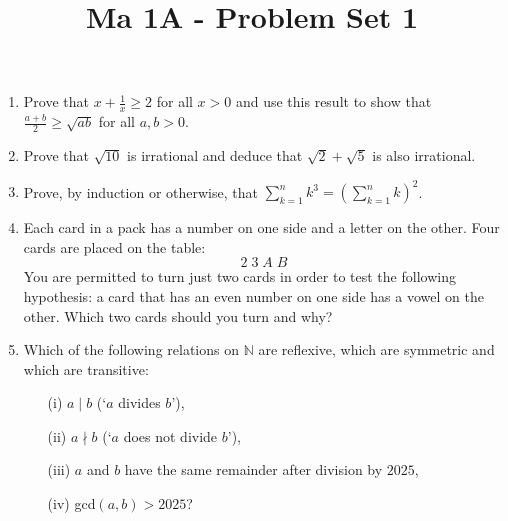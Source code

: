 \documentclass[11pt]{article}
\title{\vspace{-0.7cm}Ma 1A - Problem Set 1}
\date{}
\begin{document}
\maketitle

\begin{enumerate}

\item
Prove that $x + \frac 1x \geq 2$ for all $x > 0$ and use this result to show that $\frac{a+b}{2} \geq \sqrt{ab}$ for all $a, b > 0$.

\item
Prove that $\sqrt{10}$ is irrational and deduce that $\sqrt{2} + \sqrt{5}$ is also irrational.

\item
Prove, by induction or otherwise, that $\sum_{k=1}^n k^3 = \left(\sum_{k=1}^n k\right)^2$.

\item
Each card in a pack has a number on one side and a letter on the other. Four cards are
placed on the table:
\[ \boxed{2} \; \boxed{3} \; \boxed{A} \; \boxed{B}\]
You are permitted to turn just two cards in order to test the following hypothesis: a card that
has an even number on one side has a vowel on the other. Which two cards should you turn and why? 

\item
Which of the following relations on $\mathbb{N}$ are reflexive, which are symmetric and which are transitive:
\begin{itemize}
\item[(i)] $a \mid b$ (`$a$ divides $b$'),
\item[(ii)] $a \nmid b$ (`$a$ does not divide $b$'),
\item[(iii)] $a$ and $b$ have the same remainder after division by $2025$,
\item[(iv)] gcd$(a, b) > 2025$?
\end{itemize}

\end{enumerate}
\end{document}
